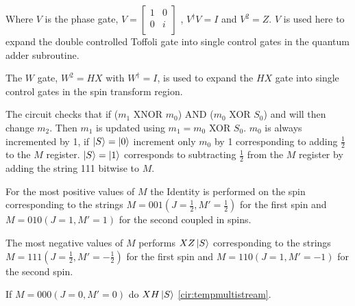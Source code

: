 Where $V$ is the phase gate, 
$ V = \begin{bmatrix}
1 & 0 \\
0 & i \\
\end{bmatrix} $
, $V^{\dag}V = I$ and $V^2 = Z$. $V$ is used here to expand the double controlled Toffoli gate into single control gates in the quantum adder subroutine.

The $W$ gate, $W^2 = HX$ with $W^{\dag} = I$, is used to expand the $HX$ gate into single control gates in the spin transform region. 

The circuit checks that if ($m_1$ XNOR $m_0$) AND ($m_0$ XOR $S_0$) and will then change $m_2$. Then $m_1$ is updated using $m_1 = m_0$ XOR $S_0$. $m_0$ is always incremented by 1, if $\left\vert{S}\right\rangle = \left\vert{0}\right\rangle$ increment only $m_0$ by 1 corresponding to adding $\frac{1}{2}$ to the $M$ register. $\left\vert{S}\right\rangle = \left\vert{1}\right\rangle$ corresponds to subtracting $\frac{1}{2}$ from the $M$ register by adding the string 111 bitwise to $M$. 
 
For the most positive values of $M$ the Identity is performed on the spin corresponding to the strings $M=001 (J=\frac{1}{2}, M' = \frac{1}{2})$ for the first spin and $M=010 (J=1, M'=1) $ for the second coupled in spins. 

The most negative values of $M$ performs $XZ \left\vert{S}\right\rangle$ corresponding to the strings $M=111 (J=\frac{1}{2}, M'=-\frac{1}{2})$ for the first spin and $M=110 (J=1, M'=-1)$ for the second spin.

If $M=000 (J=0, M'=0)$ do $XH \left\vert{S}\right\rangle$ \autoref{cir:tempmultistream}.  



